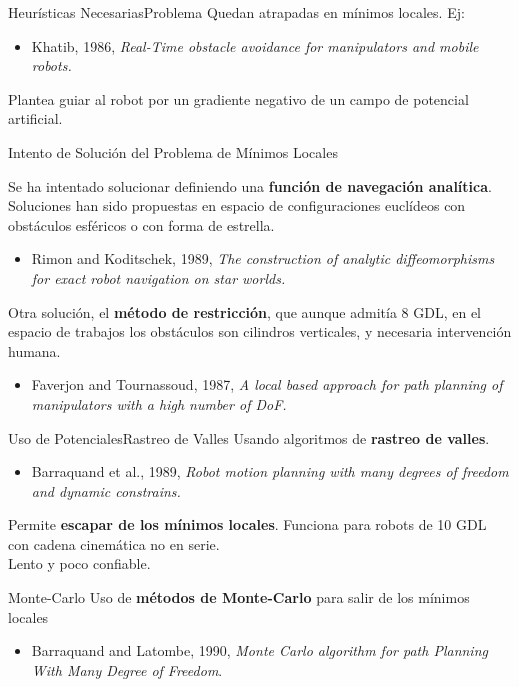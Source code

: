 \documentclass{beamer}
\begin{document}
\begin{frame}{Heurísticas Necesarias}{Problema}
Quedan atrapadas en mínimos locales. Ej: 
\begin{itemize}
\item Khatib, 1986, \textit{Real-Time obstacle avoidance for manipulators and mobile robots.}
\end{itemize}
Plantea guiar al robot por un gradiente negativo de un campo de potencial artificial.
\end{frame}

\begin{frame}{Intento de Solución del Problema de Mínimos Locales}

Se ha intentado solucionar definiendo una \textbf{función de navegación analítica}. Soluciones han sido propuestas en espacio de configuraciones euclídeos con obstáculos esféricos o con forma de estrella.
\begin{itemize}
	\item  Rimon and Koditschek, 1989, \textit{The construction of analytic diffeomorphisms for exact robot navigation on star worlds.}
\end{itemize}

\bigskip

Otra solución, el \textbf{método de restricción}, que aunque admitía 8 GDL, en el espacio de trabajos los obstáculos son cilindros verticales, y necesaria intervención humana.
\begin{itemize}
	\item Faverjon and Tournassoud, 1987, \textit{A local based approach for path planning of manipulators with a high number of DoF.}
\end{itemize}
\end{frame}

\begin{frame}{Uso de Potenciales}{Rastreo de Valles}
Usando algoritmos de \textbf{rastreo de valles}.
\begin{itemize}
	\item Barraquand et al., 1989, \textit{Robot motion planning with many degrees of freedom and dynamic constrains.}
\end{itemize}
%
Permite \textbf{escapar de los mínimos locales}. Funciona para robots de 10 GDL con cadena cinemática no en serie.\\
\medskip
Lento y poco confiable.
\end{frame}

\begin{frame}{Monte-Carlo}
Uso de \textbf{métodos de Monte-Carlo} para salir de los mínimos locales
	\begin{itemize}
	\item Barraquand and Latombe, 1990, \textit{Monte Carlo algorithm for path Planning With Many Degree of Freedom}.
	\end{itemize}
\end{frame}
\end{document}
